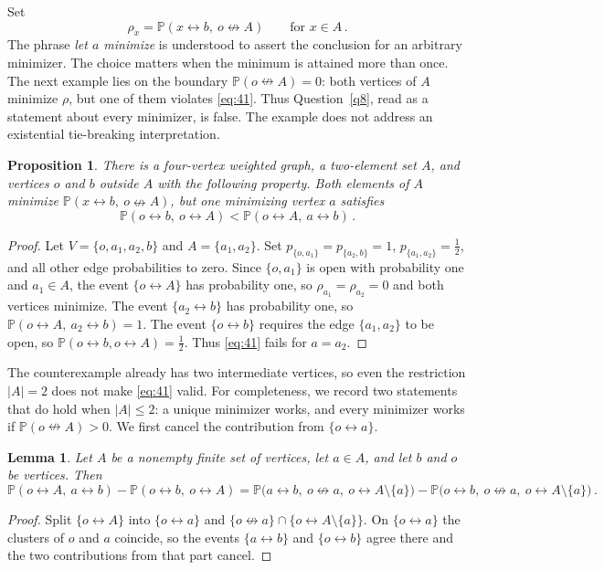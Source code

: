 \documentclass[11pt]{article}
\newtheorem{lemma}[theorem]{Lemma}
\newtheorem{proposition}[theorem]{Proposition}
\theoremstyle{definition}
\theoremstyle{remark}
\newcommand{\PP}{\mathbb P}
\newcommand{\con}{\leftrightarrow}
\newcommand{\ncon}{\nleftrightarrow}
\begin{document}
Set
\[
 \rho_x=\PP(x\con b,\ o\ncon A)\qquad\text{for } x\in A\,.
\]
The phrase \emph{let $a$ minimize} is understood to assert the conclusion for an
arbitrary minimizer. The choice matters when the minimum is attained more than once. The next
example lies on the boundary $\PP(o\ncon A)=0$: both vertices of $A$ minimize $\rho$, but
one of them violates \eqref{eq:41}. Thus Question~\ref{q8}, read as a statement about every
minimizer, is false. The example does not address an existential tie-breaking
interpretation.

\begin{proposition}\label{prop:q8}
There is a four-vertex weighted graph, a two-element set $A$, and vertices $o$ and $b$
outside $A$ with the following property. Both elements of $A$ minimize
$\PP(x\con b,\ o\ncon A)$, but one minimizing vertex $a$ satisfies
\[
 \PP(o\con b,\ o\con A)<\PP(o\con A,\ a\con b)\,.
\]
\end{proposition}

\begin{proof}
Let $V=\{o,a_1,a_2,b\}$ and $A=\{a_1,a_2\}$. Set
$p_{\{o,a_1\}}=p_{\{a_2,b\}}=1$, $p_{\{a_1,a_2\}}=\tfrac12$, and all other edge
probabilities to zero. Since $\{o,a_1\}$ is open with probability one and $a_1\in A$, the event $\{o\con A\}$
has probability one, so $\rho_{a_1}=\rho_{a_2}=0$ and both vertices minimize. The event
$\{a_2\con b\}$ has probability one, so $\PP(o\con A,\ a_2\con b)=1$. The event $\{o\con
b\}$ requires the edge $\{a_1,a_2\}$ to be open, so $\PP(o\con b,o\con A)=\tfrac12$. Thus
\eqref{eq:41} fails for $a=a_2$.
\end{proof}

The counterexample already has two intermediate vertices, so even the restriction
$|A|=2$ does not make \eqref{eq:41} valid. For completeness, we record two statements that
do hold when $|A|\leq2$: a unique minimizer works, and every minimizer works if
$\PP(o\ncon A)>0$. We first cancel the contribution from $\{o\con a\}$.

\begin{lemma}\label{lem:cancel}
Let $A$ be a nonempty finite set of vertices, let $a\in A$, and let $b$ and $o$ be
vertices. Then
\[
 \PP(o\con A,\ a\con b)-\PP(o\con b,\ o\con A)
 =\PP\bigl(a\con b,\ o\ncon a,\ o\con A\setminus\{a\}\bigr)
 -\PP\bigl(o\con b,\ o\ncon a,\ o\con A\setminus\{a\}\bigr)\,.
\]
\end{lemma}

\begin{proof}
Split $\{o\con A\}$ into $\{o\con a\}$ and $\{o\ncon a\}\cap\{o\con A\setminus\{a\}\}$. On
$\{o\con a\}$ the clusters of $o$ and $a$ coincide, so the events $\{a\con b\}$ and
$\{o\con b\}$ agree there and the two contributions from that part cancel.
\end{proof}
\end{document}
